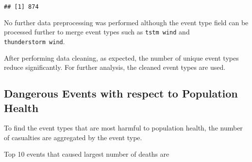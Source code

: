 \documentclass[]{article}
\newenvironment{Shaded}{\begin{snugshade}}{\end{snugshade}}
\newcommand{\KeywordTok}[1]{\textcolor[rgb]{0.13,0.29,0.53}{\textbf{#1}}}
\newcommand{\DataTypeTok}[1]{\textcolor[rgb]{0.13,0.29,0.53}{#1}}
\newcommand{\DecValTok}[1]{\textcolor[rgb]{0.00,0.00,0.81}{#1}}
\newcommand{\StringTok}[1]{\textcolor[rgb]{0.31,0.60,0.02}{#1}}
\newcommand{\CommentTok}[1]{\textcolor[rgb]{0.56,0.35,0.01}{\textit{#1}}}
\newcommand{\OperatorTok}[1]{\textcolor[rgb]{0.81,0.36,0.00}{\textbf{#1}}}
\newcommand{\NormalTok}[1]{#1}
\begin{document}
\begin{verbatim}
## [1] 874
\end{verbatim}

\begin{Shaded}
\end{Shaded}

No further data preprocessing was performed although the event type
field can be processed further to merge event types such as
\texttt{tstm\ wind} and \texttt{thunderstorm\ wind}.

After performing data cleaning, as expected, the number of unique event
types reduce significantly. For further analysis, the cleaned event
types are used.

\subsection{Dangerous Events with respect to Population
Health}\label{dangerous-events-with-respect-to-population-health}

To find the event types that are most harmful to population health, the
number of casualties are aggregated by the event type.

\begin{Shaded}
\end{Shaded}

Top 10 events that caused largest number of deaths are
\end{document}
